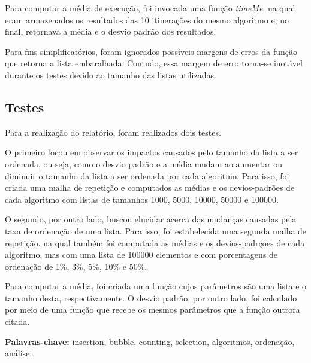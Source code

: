 \documentclass[10pt,a4paper]{article}
\begin{document}
Para computar a média de execução, foi invocada uma função \textit{timeMe}, na qual eram armazenados os resultados das 10 itinerações do mesmo algoritmo e, no final, retornava a média e o desvio padrão dos resultados.

Para fins simplificatórios, foram ignorados possíveis margens de erros da função que retorna a lista embaralhada. Contudo, essa margem de erro torna-se inotável durante os testes devido ao tamanho das listas utilizadas.
\subsection{Testes}
    Para a realização do relatório, foram realizados dois testes. 
    
    O primeiro focou em observar os impactos causados pelo tamanho da lista a ser ordenada, ou seja, como o desvio padrão e a média mudam ao aumentar ou diminuir o tamanho da lista a ser ordenada por cada algoritmo. 
    Para isso, foi criada uma malha de repetição e computados as médias e os devios-padrões de cada algoritmo com listas de tamanhos 1000, 5000, 10000, 50000 e 100000.
    
    O segundo, por outro lado, buscou elucidar acerca das mudanças causadas pela taxa de ordenação de uma lista.
    Para isso, foi estabelecida uma segunda malha de repetição, na qual também foi computada as médias e os devios-padrçoes de cada algoritmo, mas com uma lista de 100000 elementos e com porcentagens de ordenação de 1\%, 3\%, 5\%, 10\% e 50\%.
    

    Para computar a média, foi criada uma função cujos parâmetros são uma lista e o tamanho desta, respectivamente. O desvio padrão, por outro lado, foi calculado por meio de uma função que recebe os mesmos parâmetros que a função outrora citada.
    

\noindent\textbf{Palavras-chave:} insertion, bubble, counting, selection, algoritmos, ordenação, análise;

\newpage
\tableofcontents




\end{document}

